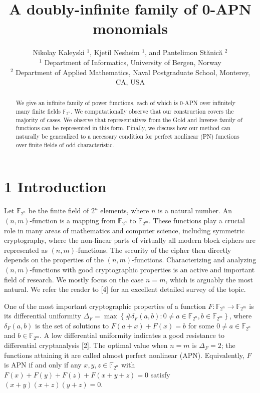 \documentclass[10pt]{article}
\title{A doubly-infinite family of 0-APN monomials }
\author{Nikolay Kaleyski ${ }^{1}$, Kjetil Nesheim ${ }^{1}$, and Pantelimon Stănică ${ }^{2}$\\
${ }^{1}$ Department of Informatics, University of Bergen, Norway\\
${ }^{2}$ Department of Applied Mathematics, Naval Postgraduate School, Monterey, CA, USA}
\date{}
\begin{document}
\maketitle


\begin{abstract}
We give an infinite family of power functions, each of which is 0-APN over infinitely many finite fields $\mathbb{F}_{2^{n}}$. We computationally observe that our construction covers the majority of cases. We observe that representatives from the Gold and Inverse family of functions can be represented in this form. Finally, we discuss how our method can naturally be generalized to a necessary condition for perfect nonlinear (PN) functions over finite fields of odd characteristic.
\end{abstract}

\section*{1 Introduction}
Let $\mathbb{F}_{2^{n}}$ be the finite field of $2^{n}$ elements, where $n$ is a natural number. An $(n, m)$-function is a mapping from $\mathbb{F}_{2^{n}}$ to $\mathbb{F}_{2^{m}}$. These functions play a crucial role in many areas of mathematics and computer science, including symmetric cryptography, where the non-linear parts of virtually all modern block ciphers are represented as $(n, m)$-functions. The security of the cipher then directly depends on the properties of the $(n, m)$-functions. Characterizing and analyzing $(n, m)$-functions with good cryptographic properties is an active and important field of research. We mostly focus on the case $n=m$, which is arguably the most natural. We refer the reader to [4] for an excellent detailed survey of the topic.

One of the most important cryptographic properties of a function $F: \mathbb{F}_{2^{n}} \rightarrow \mathbb{F}_{2^{m}}$ is its differential uniformity $\Delta_{F}=\max \left\{\# \delta_{F}(a, b): 0 \neq a \in \mathbb{F}_{2^{n}}, b \in\right. \left.\mathbb{F}_{2^{m}}\right\}$, where $\delta_{F}(a, b)$ is the set of solutions to $F(a+x)+F(x)=b$ for some $0 \neq a \in \mathbb{F}_{2^{n}}$ and $b \in \mathbb{F}_{2^{m}}$. A low differential uniformity indicates a good resistance to differential cryptanalysis [2]. The optimal value when $n=m$ is $\Delta_{F}=2$; the functions attaining it are called almost perfect nonlinear (APN). Equivalently, $F$ is APN if and only if any $x, y, z \in \mathbb{F}_{2^{n}}$ with $F(x)+ F(y)+F(z)+F(x+y+z)=0$ satisfy $(x+y)(x+z)(y+z)=0$.
\end{document}
